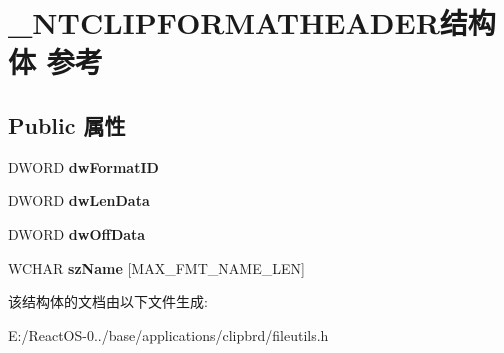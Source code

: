 \hypertarget{struct___n_t_c_l_i_p_f_o_r_m_a_t_h_e_a_d_e_r}{}\section{\+\_\+\+N\+T\+C\+L\+I\+P\+F\+O\+R\+M\+A\+T\+H\+E\+A\+D\+E\+R结构体 参考}
\label{struct___n_t_c_l_i_p_f_o_r_m_a_t_h_e_a_d_e_r}
\subsection*{Public 属性}
\begin{DoxyCompactItemize}
\item 
\mbox{\label{struct___n_t_c_l_i_p_f_o_r_m_a_t_h_e_a_d_e_r_a6a1b43b4e447b7ce21ae9637c8862f95}} 
D\+W\+O\+RD {\bfseries dw\+Format\+ID}
\item 
\mbox{\label{struct___n_t_c_l_i_p_f_o_r_m_a_t_h_e_a_d_e_r_a34c07a4aac1e29f37b2d87c221e0ffcc}} 
D\+W\+O\+RD {\bfseries dw\+Len\+Data}
\item 
\mbox{\label{struct___n_t_c_l_i_p_f_o_r_m_a_t_h_e_a_d_e_r_ac67fea6dfa950be9dc78c84a5040621b}} 
D\+W\+O\+RD {\bfseries dw\+Off\+Data}
\item 
\mbox{\label{struct___n_t_c_l_i_p_f_o_r_m_a_t_h_e_a_d_e_r_a8b80230619e288145449a7a321b592e9}} 
W\+C\+H\+AR {\bfseries sz\+Name} \mbox{[}M\+A\+X\+\_\+\+F\+M\+T\+\_\+\+N\+A\+M\+E\+\_\+\+L\+EN\mbox{]}
\end{DoxyCompactItemize}


该结构体的文档由以下文件生成\+:\begin{DoxyCompactItemize}
\item 
E\+:/\+React\+O\+S-\/0../base/applications/clipbrd/fileutils.\+h\end{DoxyCompactItemize}
